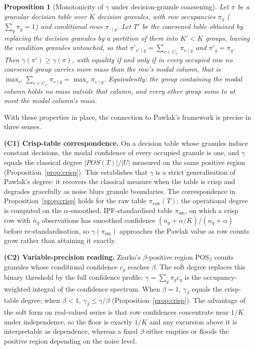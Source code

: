 \documentclass[11pt,a4paper]{article}
\newtheorem{proposition}{Proposition}
\begin{document}
\begin{proposition}[Monotonicity of $\gamma$ under decision-granule coarsening]
\label{prop:granular}
Let $\pi$ be a granular decision table over $K$ decision granules, with row
occupancies $\pi_g$ ($\sum_g \pi_g = 1$) and conditional rows
$\pi_{\cdot\mid g}$. Let $T'$ be the coarsened table obtained by replacing
the decision granules by a partition of them into $K' < K$ groups, leaving
the condition granules untouched, so that
$\pi'_{v'\mid g} = \sum_{v \in C_{v'}} \pi_{v\mid g}$ and $\pi'_g = \pi_g$.
Then $\gamma(\pi') \geq \gamma(\pi)$, with equality if and only if in every
occupied row no coarsened group carries more mass than the row's modal
column, that is
$\max_{v'} \sum_{v \in C_{v'}} \pi_{v\mid g} = \max_v \pi_{v\mid g}$.
Equivalently: the group containing the modal column holds no mass outside
that column, and every other group sums to at most the modal column's mass.
\end{proposition}

With these properties in place, the connection to Pawlak's framework
is precise in three senses.

\textbf{(C1) Crisp-table correspondence.} On a decision table whose
granules induce constant decisions, the modal confidence of every occupied
granule is one, and $\gamma$ equals the classical degree
$|POS(T)|/|U|$ measured on the same positive region
(Proposition~\ref{prop:crisp}). This establishes that $\gamma$ is
a strict generalisation of Pawlak's degree: it recovers the classical
measure when the table is crisp and degrades gracefully as noise blurs
granule boundaries. The correspondence in
Proposition~\ref{prop:crisp} holds for the raw table
$\pi_{\mathrm{raw}}(T)$; the operational degree is computed on the
$\alpha$-smoothed, IPF-standardised table $\pi_{\mathrm{sm}}$, on which a
crisp row with $n_g$ observations has smoothed confidence
$(n_g+\alpha/K)/(n_g+\alpha)$ before re-standardisation, so
$\gamma(\pi_{\mathrm{sm}})$ approaches the Pawlak value
as row counts grow rather than attaining it exactly.

\textbf{(C2) Variable-precision reading.} Ziarko's $\beta$-positive
region $\mathrm{POS}_\beta$ counts granules whose conditional confidence
$c_g$ reaches $\beta$. The soft degree replaces this binary threshold by
the full confidence profile: $\gamma = \sum_g \pi_g c_g$ is the
occupancy-weighted integral of the confidence spectrum. When $\beta=1$,
$\gamma_\beta$ equals the crisp-table degree; when $\beta<1$,
$\gamma_\beta \leq \gamma / \beta$ (Proposition~\ref{prop:crisp}).
The advantage of the soft form on real-valued series is that row
confidences concentrate near $1/K$ under independence, so the floor is
exactly $1/K$ and any excursion above it is interpretable as dependence,
whereas a fixed $\beta$ either empties or floods the positive region
depending on the noise level.
\end{document}
